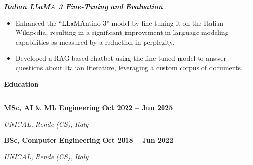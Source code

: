 \documentclass[9pt, a4paper]{article}
\newcommand{\cvsection}[1]{%
	\vspace{2pt}\par
	{\Large\bfseries\color{sectionblue}#1}\par
	\vspace{2pt}\hrule\vspace{6pt}
}
\newcommand{\cvsubsection}[3]{%
	\par {\large\bfseries #1} \hfill {\bfseries #2} \par {\textit{#3}} \vspace{4pt}
}
\newcommand{\cvproject}[1]{%
	\par {\large{\bfseries{\textit{#1}}}} \par \vspace{4pt}
}
\begin{document}
\begin{minipage}[t]{0.70\linewidth}
		\vspace{6pt}
		\cvproject{\href{https://github.com/bGuzzo/Italian-LLaMA-Project}{Italian LLaMA 3 Fine-Tuning and Evaluation}}
		\begin{itemize}[leftmargin=*, nosep]
			\item \footnotesize Enhanced the ``LLaMAntino-3'' model by fine-tuning it on the Italian Wikipedia, resulting in a significant improvement in language modeling capabilities as measured by a reduction in perplexity.
			
			\vspace{2pt}
			\item \footnotesize Developed a RAG-based chatbot using the fine-tuned model to answer questions about Italian literature, leveraging a custom corpus of documents.
		\end{itemize}
		
		\vspace{10pt}\par
		\cvsection{Education}
		
		\cvsubsection{MSc, AI \& ML Engineering}{Oct 2022 -- Jun 2025}{UNICAL, Rende (CS), Italy}
		\cvsubsection{BSc, Computer Engineering}{Oct 2018 -- Jun 2022}{UNICAL, Rende (CS), Italy}
		
	\end{minipage}%
	\hfill%
\end{document}
